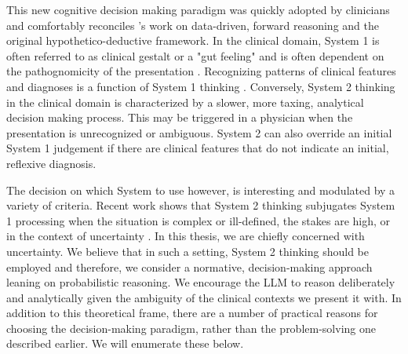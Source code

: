 This new cognitive decision making paradigm was quickly adopted by clinicians and comfortably reconciles \citet{patelKnowledgeBasedSolution1986}'s work on data-driven, forward reasoning and the original hypothetico-deductive framework. In the clinical domain, System 1 is often referred to as clinical gestalt or a "gut feeling" and is often dependent on the pathognomicity of the presentation \citep{croskerryUniversalModelDiagnostic2009}. Recognizing patterns of clinical features and diagnoses is a function of System 1 thinking \citep{groenMedicalProblemsolvingQuestionable1985, blois1984information}. Conversely, System 2 thinking in the clinical domain is characterized by a slower, more taxing, analytical decision making process. This may be triggered in a physician when the presentation is unrecognized or ambiguous. System 2 can also override an initial System 1 judgement if there are clinical features that do not indicate an initial, reflexive diagnosis.

The decision on which System to use however, is interesting and modulated by a variety of criteria. Recent work shows that System 2 thinking subjugates System 1 processing when the situation is complex or ill-defined, the stakes are high, or in the context of uncertainty \citep{croskerryCriticalThinkingReasoning, moultonSlowingWhenYou2007}. In this thesis, we are chiefly concerned with uncertainty. We believe that in such a setting, System 2 thinking should be employed and therefore, we consider a normative, decision-making approach leaning on probabilistic reasoning. We encourage the LLM to reason deliberately and analytically given the ambiguity of the clinical contexts we present it with. In addition to this theoretical frame, there are a number of practical reasons for choosing the decision-making paradigm, rather than the problem-solving one described earlier. We will enumerate these below. 




